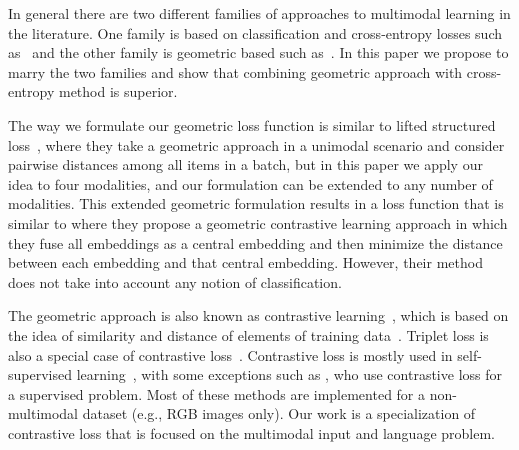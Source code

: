\documentclass[10pt]{article} %
\newcommand{\todokdinline}[1]{\todo[color=red!20,inline]{{KD: \small #1}}}
\newcommand{\todocmi}[1]{\todo[inline,color=green!40]{\small #1 -- Cynthia}}
\begin{document}
In general there are two different families of approaches to multimodal learning in the literature. One family is based on classification and cross-entropy losses such as~\citet{NEURIPS2020_supervised_contrastive, chen2020simple} and the other family is geometric based such as~\citet{ICML22GeometricMultimodal,Carvalho-cooking-triplet,salvador2017cooking,triplet_loss_2021_CVPR}.
In this paper we propose to marry the two families and show that combining geometric approach with cross-entropy method is superior.


The way we formulate our geometric loss function is similar to lifted structured loss~\citep{songCVPR16LiftedStructured}, where they take a geometric approach in a unimodal scenario and consider pairwise distances among all items in a batch, but in this paper we apply our idea to four modalities, and our formulation can be extended to any number of modalities.
This extended geometric formulation results in a loss function that is similar to \citet{ICML22GeometricMultimodal} where they propose a geometric contrastive learning approach in which they %
fuse all embeddings as a central embedding and then minimize the distance between each embedding and that central embedding. However, their method does not take into account any notion of classification.

The geometric approach is also known as contrastive learning~\citep{qin2021world}, which is based on the idea of similarity and distance of elements of training data~\citep{Carvalho-cooking-triplet,triplet_loss_2021_CVPR,salvador2017cooking}. Triplet loss is also a special case of contrastive loss~\citep{NEURIPS2020_supervised_contrastive}. Contrastive loss is mostly used in self-supervised learning~\citep{bui2021self, alayrac2020self,chen2020simple}, with some exceptions such as \citet{NEURIPS2020_supervised_contrastive}, who use contrastive loss for a supervised problem. Most of these methods are implemented for a non-multimodal dataset (e.g., RGB images only). Our work is a specialization of contrastive loss that is focused on the multimodal input and language problem.
\end{document}
